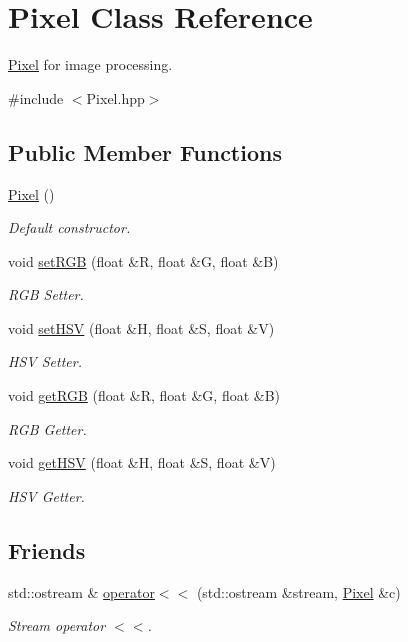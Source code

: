 \hypertarget{classPixel}{}\section{Pixel Class Reference}
\label{classPixel}


\hyperlink{classPixel}{Pixel} for image processing.  




{\ttfamily \#include $<$Pixel.\+hpp$>$}

\subsection*{Public Member Functions}
\begin{DoxyCompactItemize}
\item 
\hyperlink{classPixel_a27ad99a2f705e635c42d242d530d4756}{Pixel} ()
\begin{DoxyCompactList}\small\item\em Default constructor. \end{DoxyCompactList}\item 
void \hyperlink{classPixel_a8136f0a0bd54795ee065eeccb1e2ba1f}{set\+R\+GB} (float \&R, float \&G, float \&B)
\begin{DoxyCompactList}\small\item\em R\+GB Setter. \end{DoxyCompactList}\item 
void \hyperlink{classPixel_a992f88169f2395b752b5480f825efe72}{set\+H\+SV} (float \&H, float \&S, float \&V)
\begin{DoxyCompactList}\small\item\em H\+SV Setter. \end{DoxyCompactList}\item 
void \hyperlink{classPixel_a87c0f730000ab94e4d5bce5e2f4b435b}{get\+R\+GB} (float \&R, float \&G, float \&B)
\begin{DoxyCompactList}\small\item\em R\+GB Getter. \end{DoxyCompactList}\item 
void \hyperlink{classPixel_a70dc52435e31c139f3d04c601e2ca075}{get\+H\+SV} (float \&H, float \&S, float \&V)
\begin{DoxyCompactList}\small\item\em H\+SV Getter. \end{DoxyCompactList}\end{DoxyCompactItemize}
\subsection*{Friends}
\begin{DoxyCompactItemize}
\item 
std\+::ostream \& \hyperlink{classPixel_a3cbd62658db95c52ea5471707d3aaf01}{operator$<$$<$} (std\+::ostream \&stream, \hyperlink{classPixel}{Pixel} \&c)
\begin{DoxyCompactList}\small\item\em Stream operator $<$$<$. \end{DoxyCompactList}\end{DoxyCompactItemize}


